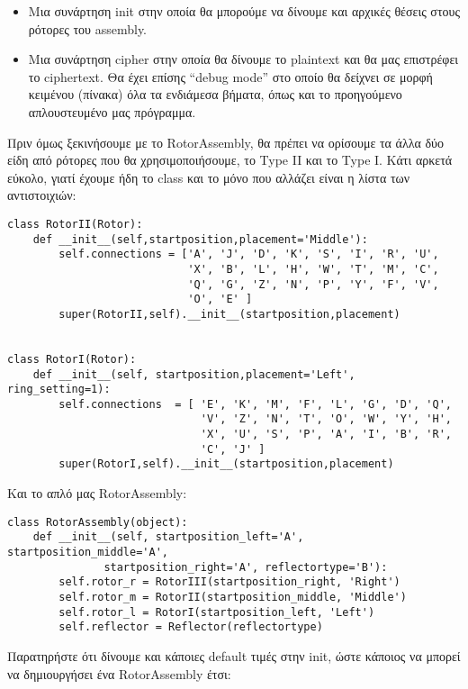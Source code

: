 \documentclass[a4paper,twoside,12pt]{article}
\begin{document}
\begin{itemize}
\item Μια συνάρτηση init στην οποία θα μπορούμε να δίνουμε και αρχικές θέσεις στους ρότορες του assembly.

\item Μια συνάρτηση cipher στην οποία θα δίνουμε το plaintext και θα μας επιστρέφει το ciphertext. Θα έχει επίσης “debug mode” στο οποίο θα δείχνει σε μορφή κειμένου (πίνακα) όλα τα ενδιάμεσα βήματα, όπως και το προηγούμενο απλουστευμένο μας πρόγραμμα.
\end{itemize}

Πριν όμως ξεκινήσουμε με το RotorAssembly, θα πρέπει να ορίσουμε τα άλλα δύο είδη από ρότορες που θα χρησιμοποιήσουμε, το Type II και το Type I. Κάτι αρκετά εύκολο, γιατί έχουμε ήδη το class και το μόνο που αλλάζει είναι η λίστα των αντιστοιχιών:

\begin{verbatim}
class RotorII(Rotor):
    def __init__(self,startposition,placement='Middle'):
        self.connections = ['A', 'J', 'D', 'K', 'S', 'I', 'R', 'U',
                            'X', 'B', 'L', 'H', 'W', 'T', 'M', 'C',
                            'Q', 'G', 'Z', 'N', 'P', 'Y', 'F', 'V',
                            'O', 'E' ]
        super(RotorII,self).__init__(startposition,placement)


class RotorI(Rotor):
    def __init__(self, startposition,placement='Left', ring_setting=1):
        self.connections  = [ 'E', 'K', 'M', 'F', 'L', 'G', 'D', 'Q',
                              'V', 'Z', 'N', 'T', 'O', 'W', 'Y', 'H',
                              'X', 'U', 'S', 'P', 'A', 'I', 'B', 'R',
                              'C', 'J' ]
        super(RotorI,self).__init__(startposition,placement)
\end{verbatim}

Και το απλό μας RotorAssembly:

\begin{verbatim}
class RotorAssembly(object):
    def __init__(self, startposition_left='Α', startposition_middle='Α',
	           startposition_right='Α', reflectortype='B'):
        self.rotor_r = RotorIII(startposition_right, 'Right')
        self.rotor_m = RotorII(startposition_middle, 'Middle')
        self.rotor_l = RotorI(startposition_left, 'Left')
        self.reflector = Reflector(reflectortype)
\end{verbatim}

Παρατηρήστε ότι δίνουμε και κάποιες default τιμές στην init, ώστε κάποιος να μπορεί να δημιουργήσει ένα RotorAssembly  έτσι:
\end{document}
